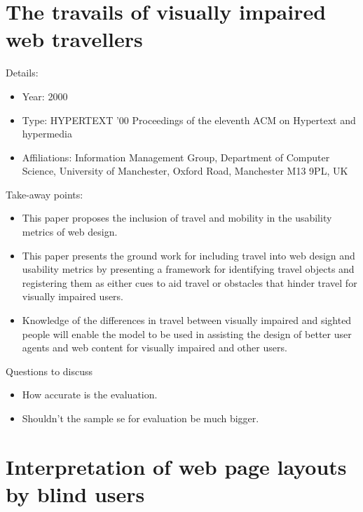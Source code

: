 \documentclass[12pt, onecolumn]{IEEEtran}
\begin{document}
\section{The travails of visually impaired web travellers
\cite{Goble:2000:travails}}

\noindent Details:
\begin{itemize}
  \item Year: 2000
  \item Type: HYPERTEXT '00 Proceedings of the eleventh ACM on Hypertext and hypermedia
  \item Affiliations: Information Management Group, Department of Computer
  Science, University of Manchester, Oxford Road, Manchester M13 9PL, UK
\end{itemize}
\medskip
Take-away points:
\begin{itemize}
  \item This paper proposes the inclusion of travel and mobility in 
the usability metrics of web design.
\item This paper presents the ground work for 
including travel into web design and usability metrics by 
presenting a framework for identifying travel objects and 
registering them as either cues to aid travel or obstacles that 
hinder travel for visually impaired users.
\item Knowledge of the differences in travel between 
visually impaired and sighted people will enable the model 
to be used in assisting the design of better user agents and 
web content for visually impaired and other users.  
\end{itemize}
	
\noindent Questions to discuss
\begin{itemize}
  \item How accurate is the evaluation.
  \item Shouldn't the sample se for evaluation be much bigger.
\end{itemize}
\bigskip\bigskip

\section{Interpretation of web page layouts by blind users
\cite{Francisco-Revilla:2010:blind}}
\end{document}
